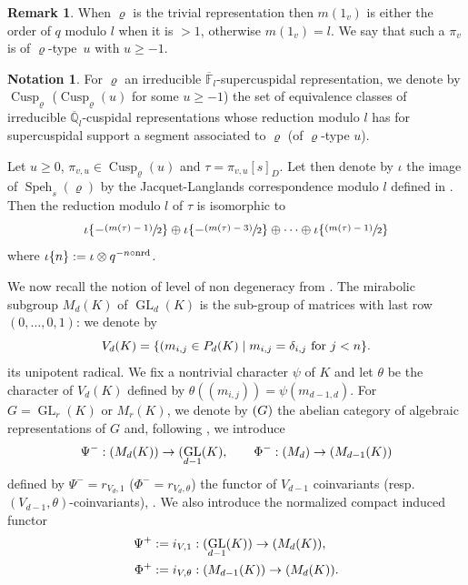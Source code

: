 \documentclass[JEP,XML,SOM,Unicode,published]{cedram}
\newcommand{\NoChangel}[1]{%
\expandafter\let\csname old\string#1\endcsname=#1
\let#1=\relax
\newcommand{#1}{\mathcode`l="716C\csname old\string#1\endcsname\mathcode`l="7160 }%
}
\let\sep\mid
\newcommand{\psfrac}[2]{\sfrac{(#1)}{#2}}
\DeclareMathOperator{\GL}{GL}
\theoremstyle{plain}
\theoremstyle{definition}
\newtheorem*{remark}{Remark}
\newtheorem{nota}[equation]{Notation}
\numberwithin{equation}{subsection}
\newcommand\Fm{{\mathbb F}}
\newcommand\Qm{{\mathbb Q}}
\DeclareMathOperator{\cusp}{Cusp}
\DeclareMathOperator{\speh}{Speh}
\DeclareMathOperator{\val}{val}\NoChangel{\val}
\DeclareMathOperator{\nrd}{nrd}
\DeclareMathOperator{\alg}{Alg}\NoChangel{\alg}
\begin{document}
\begin{remark}
When $\varrho$ is the trivial representation then $m(1_v)$ is either the order of $q$ modulo $l$
when it is $>1$, otherwise $m(1_v)=l$.
We say that such a $\pi_v$ is of $\varrho$-type~$u$ with $u \geq -1$.
\end{remark}


\begin{nota}
For $\varrho$ an irreducible $\overline \Fm_l$-supercuspidal representation, we denote by
$\cusp_\varrho$ (\resp $\cusp_\varrho(u)$ for some $u \geq -1$)
the set of equivalence classes of irreducible
$\overline \Qm_l$-cuspidal representations whose reduction modulo $l$ has
for supercuspidal
support a segment associated to $\varrho$ (\resp of $\varrho$-type $u$).
\end{nota}

Let $u \geq 0$, $\pi_{v,u} \in \cusp_{\varrho}(u)$ and $\tau=\pi_{v,u}[s]_{D}$. Let then denote
by $\iota$ the image of $\speh_s(\varrho)$ by the Jacquet-Langlands
correspondence modulo $l$
defined in \cite[\S 1.2.4]{dat-jl}. Then the reduction modulo $l$ of $\tau$ is isomorphic to
\begin{equation} \label{eq-red-tau}
\iota \{-\psfrac{m(\tau)-1}{2}\} \oplus \iota \{-\psfrac{m(\tau)-3}{2}\} \oplus \cdots \oplus \iota \{\psfrac{m(\tau)-1}{2}\}
\end{equation}
where $\iota \{n\}:=\iota \otimes q^{-n \val \circ \nrd}$.

We now recall the notion of level of non degeneracy from \cite[\S4]{zelevinski1}.
The mirabolic subgroup
$M_d(K)$ of $\GL_d(K)$ is the sub-group of matrices with last row $(0,\dots,0,1)$: we denote by
\[
V_d(K)=\{(m_{i,j} \in P_d(K)\sep m_{i,j}= \delta_{i,j} \hbox{ for } j < n\}.
\]
its unipotent radical. We fix a nontrivial character $\psi$ of $K$ and let $\theta$ be the
character of $V_d(K)$ defined by $\theta((m_{i,j}))=\psi(m_{d-1,d})$.
For $G=\GL_r(K)$ or $M_r(K)$, we denote by $\alg(G)$ the abelian category of algebraic
representations of $G$ and, following \cite{zelevinski1}, we introduce
\[
\Psi^-: \alg(M_d(K)) \to \alg(\GL_{d-1}(K), \qquad \Phi^-: \alg (M_d) \to
\alg (M_{d-1}(K))
\]
defined by $\Psi^-=r_{V_d,1}$ (\resp $\Phi^-=r_{V_d,\theta}$) the functor of $V_{d-1}$
coinvariants (resp.\ $(V_{d-1},\theta)$-coinvariants), \cf \cite[1.8]{zelevinski1}.
We also introduce the normalized compact induced functor
\begin{align*}
\Psi^+&:=i_{V,1}: \alg(\GL_{d-1}(K)) \to \alg (M_d(K)),
\\
\Phi^+&:=i_{V,\theta}: \alg(M_{d-1}(K)) \to \alg(M_d(K)).
\end{align*}
\end{document}
